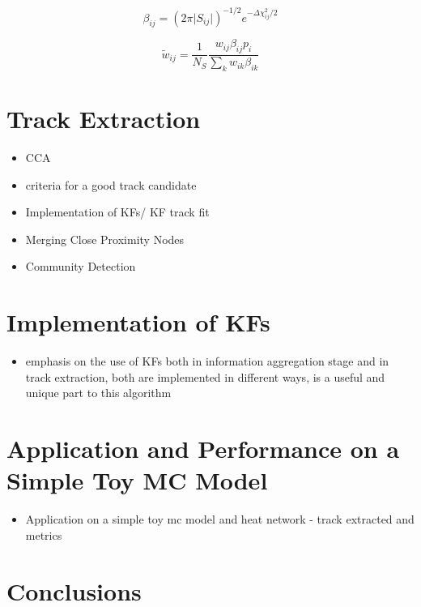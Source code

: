 \begin{equation}
\beta_{ij} = (2 \pi \lvert S_{ij} \rvert )^{-1/2}  e^{-\Delta \chi^{2}_{ij} / 2}
\label{eqn:likelihood}
\end{equation}

\begin{equation}
\widetilde{w}_{ij} = \frac{1}{N_S} \frac{w_{ij}\beta_{ij} p_i}{\sum_{k}w_{ik}\beta_{ik}}
\label{eqn:weights}
\end{equation}



\section{Track Extraction}
\begin{itemize}
    \item CCA
    \item criteria for a good track candidate
    \item Implementation of KFs/ KF track fit
    \item Merging Close Proximity Nodes
    \item Community Detection
\end{itemize}



\section{Implementation of KFs}
\label{gnn-kf-implementation}

\begin{itemize}
\item emphasis on the use of KFs both in information aggregation stage and in track extraction, both are implemented in different ways, is a useful and unique part to this algorithm
\end{itemize}



\section{Application and Performance on a Simple Toy MC Model}
\label{gnn-application-toy-model}


\begin{itemize}
\item Application on a simple toy mc model and heat network - track extracted and metrics
\end{itemize}



\section{Conclusions}
